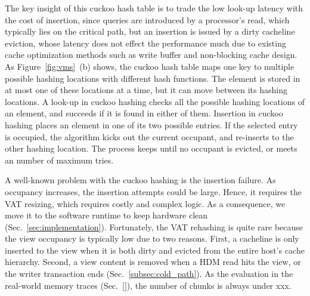 The key insight of this cuckoo hash table is to trade the low look-up latency with the cost of insertion, since queries are introduced by a processor's read, which typically lies on the critical path, but an insertion is issued by a dirty cacheline eviction, whose latency does not effect the performance much due to existing cache optimization methods such as write buffer and non-blocking cache design. 
As Figure~\ref{fig:vms}~(b) shows, the cuckoo hash table maps one key to multiple possible hashing locations with different hash functions. The element is stored in at most one of these locations at a time, but it can move between its hashing locations. A look-up in cuckoo hashing checks all the possible hashing locations of an element, and succeeds if it is found in either of them. Insertion in cuckoo hashing places an element in one of its two possible entries. If the selected entry is occupied, the algorithm kicks out the current occupant, and re-inserts to the other hashing location. The process keeps until no occupant is evicted, or meets an number of maximum tries. 


A well-known problem with the cuckoo hashing is the insertion failure. As occupancy increases, the insertion attempts could be large. Hence, it requires the VAT resizing, which requires costly and complex logic. As a consequence, we move it to the software runtime to keep hardware clean (Sec.~\ref{sec:implementation}). 
Fortunately, the VAT rehashing is quite rare because the view occupancy is typically low due to two reasons. First, a cacheline is only inserted to the view when it is both dirty and evicted from the entire host's cache hierarchy. Second, a view content is removed when a HDM read hits the view, or the writer transaction ends (Sec.~\ref{subsec:cold_path}). As the evaluation in the real-world memory traces (Sec.~\ref{}), the number of chunks is always under xxx. 




